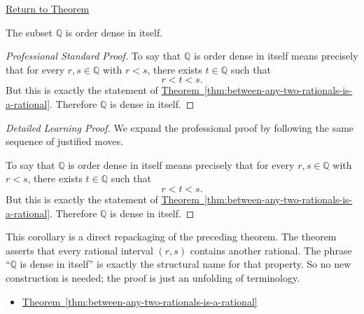 \newpage
{}
\label{prf:q-dense-in-itself}

\begin{remark*}[Return]
\hyperref[cor:q-dense-in-itself]{Return to Theorem}
\end{remark*}

\begin{corollary*}
The subset $\mathbb{Q}$ is order dense in itself.
\end{corollary*}

\begin{proof}[Professional Standard Proof]
\LRAProofBodyStart
To say that $\mathbb{Q}$ is order dense in itself means precisely that for
every $r,s\in\mathbb{Q}$ with $r<s$, there exists $t\in\mathbb{Q}$ such that
\[
r<t<s.
\]
But this is exactly the statement of
\hyperref[thm:between-any-two-rationals-is-a-rational]{Theorem~\ref*{thm:between-any-two-rationals-is-a-rational}}.
Therefore $\mathbb{Q}$ is dense in itself.
\end{proof}

\begin{proof}[Detailed Learning Proof]
\LRAProofBodyStart
We expand the professional proof by following the same sequence of justified moves.

To say that $\mathbb{Q}$ is order dense in itself means precisely that for
every $r,s\in\mathbb{Q}$ with $r<s$, there exists $t\in\mathbb{Q}$ such that
\[
r<t<s.
\]
But this is exactly the statement of
\hyperref[thm:between-any-two-rationals-is-a-rational]{Theorem~\ref*{thm:between-any-two-rationals-is-a-rational}}.
Therefore $\mathbb{Q}$ is dense in itself.
\end{proof}

\begin{remark*}
This corollary is a direct repackaging of the preceding theorem.  The theorem
asserts that every rational interval $(r,s)$ contains another rational.  The
phrase ``$\mathbb{Q}$ is dense in itself'' is exactly the structural name for
that property.  So no new construction is needed; the proof is just an
unfolding of terminology.
\end{remark*}

\begin{dependencies}
\begin{itemize}
  \item \hyperref[thm:between-any-two-rationals-is-a-rational]{Theorem~\ref*{thm:between-any-two-rationals-is-a-rational}}
\end{itemize}
\end{dependencies}

\clearpage
